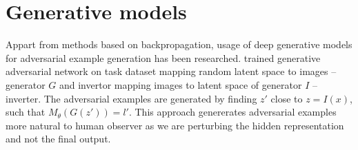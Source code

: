 \section{Generative models}
\label{sec:advex_gan}
Appart from methods based on backpropagation, usage of deep generative models for adversarial example generation has been researched. \cite{gan-advex} trained generative adversarial network on task dataset mapping random latent space to images -- generator $G$ and invertor mapping images to latent space of generator $I$ -- inverter. The adversarial examples are generated by finding $z'$ close to $z = I(x)$, such that $M_\theta(G(z')) = l'$. This approach genererates adversarial examples more natural to human observer as we are perturbing the hidden representation and not the final output.
